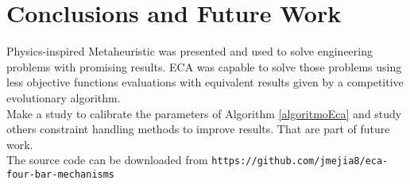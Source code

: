 \documentclass[12pt,letterpape]{article}
\begin{document}
\section{Conclusions and Future Work} %
\label{sec:conclusion_and_future_work}

Physics-inspired Metaheuristic was presented and used to solve engineering 
problems with promising results. ECA was capable to solve those problems using
less objective functions evaluations with equivalent results given by a 
competitive evolutionary algorithm.\\

Make a study to calibrate the parameters of Algorithm \ref{algoritmoEca} and study
others constraint handling methods to improve results. That are part of future work.\\

\noindent
The source code can be downloaded from
\verb|https://github.com/jmejia8/eca-four-bar-mechanisms|




\end{document}

